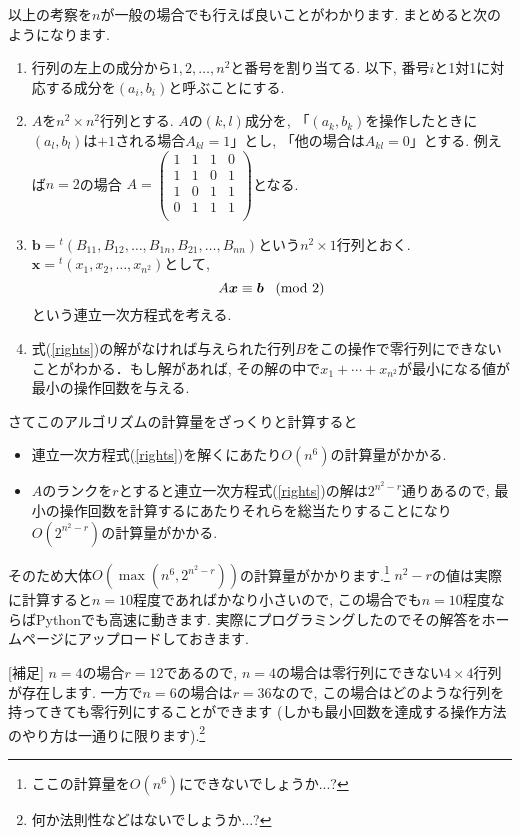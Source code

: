 \documentclass[dvipdfmx,a4paper,11pt]{article}
\theoremstyle{definition}
\begin{document}
以上の考察を$n$が一般の場合でも行えば良いことがわかります. 
まとめると次のようになります.
\begin{enumerate}
\item 行列の左上の成分から$1, 2, \ldots, n^2$と番号を割り当てる. 以下, 番号$i$と1対1に対応する成分を$(a_i, b_i)$と呼ぶことにする.
\item $A$を$n^2 \times n^2$行列とする. $A$の$(k,l)$成分を, 「$(a_k, b_k)$を操作したときに$(a_l,b_l)$は$+1$される場合$A_{kl}=1$」とし, 「他の場合は$A_{kl}=0$」とする.
例えば$n=2$の場合
$A=\begin{pmatrix}
1&1&1&0\\
1&1&0&1\\
1&0&1&1\\
0&1&1&1\\
 \end{pmatrix}$となる.
\item $\bm{b} = {}^t (B_{11}, B_{12}, \ldots, B_{1n}, B_{21}, \ldots, B_{nn})$という$n^2 \times 1$行列とおく. $\bm{x} = {}^t (x_1, x_2, \ldots, x_{n^2})$として, 
\begin{equation}
\label{rights}
A\bm{x} \equiv \bm{b}  \text{\,\,\, (mod 2)}
\end{equation}
という連立一次方程式を考える.
\item 式(\ref{rights})の解がなければ与えられた行列$B$をこの操作で零行列にできないことがわかる．もし解があれば, その解の中で$x_1 + \cdots + x_{n^2}$が最小になる値が最小の操作回数を与える.
\end{enumerate}

さてこのアルゴリズムの計算量をざっくりと計算すると
\begin{itemize}
\item 連立一次方程式(\ref{rights})を解くにあたり$O(n^6)$の計算量がかかる.
\item $A$のランクを$r$とすると連立一次方程式(\ref{rights})の解は$2^{n^2 -r}$通りあるので, 最小の操作回数を計算するにあたりそれらを総当たりすることになり$O(2^{n^2-r})$の計算量がかかる.
\end{itemize}
そのため大体$O(\max(n^6, 2^{n^2-r}))$の計算量がかかります.\footnote{ここの計算量を$O(n^6)$にできないでしょうか...?}
 $n^2-r$の値は実際に計算すると$n=10$程度であればかなり小さいので, この場合でも$n=10$程度ならばPythonでも高速に動きます. 実際にプログラミングしたのでその解答をホームページにアップロードしておきます.
 
[補足] $n=4$の場合$r=12$であるので, $n=4$の場合は零行列にできない$4 \times 4$行列が存在します. 
一方で$n=6$の場合は$r=36$なので, この場合はどのような行列を持ってきても零行列にすることができます (しかも最小回数を達成する操作方法のやり方は一通りに限ります).\footnote{何か法則性などはないでしょうか...?}
\end{document}
